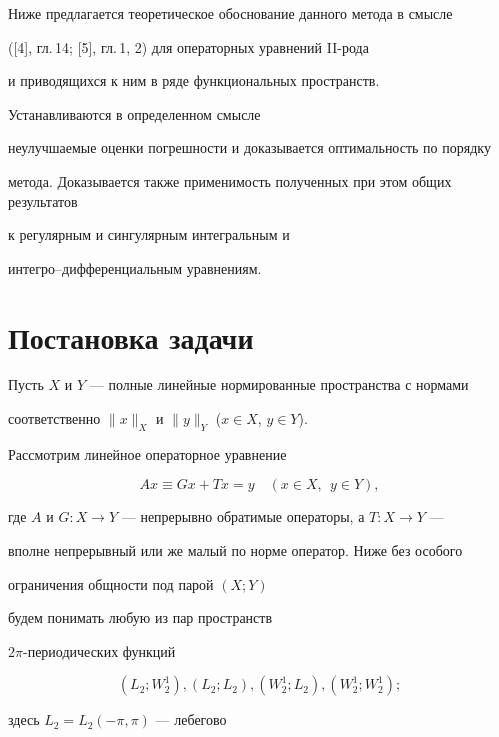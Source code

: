 Ниже предлагается теоретическое обоснование данного метода в смысле 


([4], гл.\,14; [5], гл.\,1, 2) для операторных уравнений II-рода 


и приводящихся к ним в ряде функциональных пространств.


Устанавливаются в определенном смысле


неулучшаемые оценки погрешности и доказывается оптимальность по порядку


метода. Доказывается также применимость полученных при этом общих результатов


к регулярным и сингулярным интегральным и


интегро--дифференциальным уравнениям.





\section{Постановка задачи}





Пусть $X$ и $Y$ --- полные линейные нормированные пространства с нормами


соответственно $\|x\|_X$ и $\|y\|_Y$ ($x\in X$, $y\in Y$).


Рассмотрим линейное операторное уравнение


\begin{equation}


Ax \equiv Gx+Tx=y \quad (x \in X, \ \ y \in Y),


\end{equation}


где $A$ и $G:X \to Y$ --- непрерывно обратимые операторы, а $T:X\to Y$ ---


вполне непрерывный или же малый по норме оператор. Ниже без особого


ограничения общности под парой $(X;Y)$


будем понимать любую из пар пространств


$2 \pi$-периодических функций


\begin{equation}


(L_2 ; W_{2}^{1}),(L_2;L_2),(W_{2}^{1};L_2),(W_{2}^{1};W_{2}^{1});


\end{equation}


здесь $L_2=L_2 (- \pi, \pi)$ --- лебегово 


